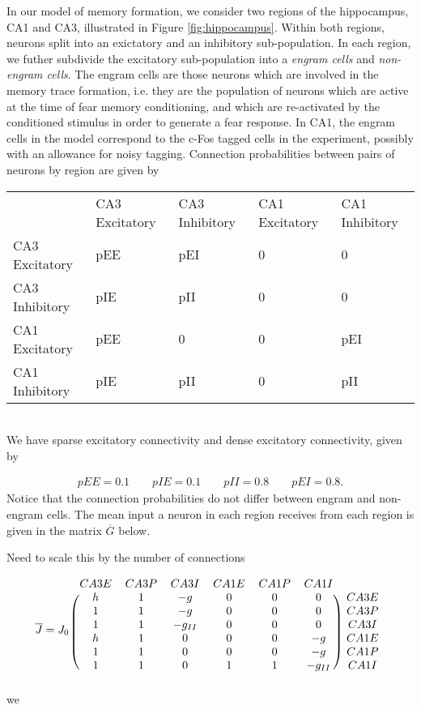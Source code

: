\documentclass [12pt]{amsart}
\theoremstyle{definition}
\begin{document}
In our model of memory formation, we consider two regions of the hippocampus, CA1 and CA3, illustrated in Figure \ref{fig:hippocampus}. Within both regions, neurons split into an exictatory and an inhibitory sub-population. In each region, we futher subdivide the excitatory sub-population into a \emph{engram cells} and \emph{non-engram cells}. The engram cells are those neurons which are involved in the memory trace formation, i.e. they are the population of neurons which are active at the time of fear memory conditioning, and which are re-activated by the conditioned stimulus in order to generate a fear response. In CA1, the engram cells in the model correspond to the c-Fos tagged cells in the experiment, possibly with an allowance for noisy tagging. 
Connection probabilities between pairs of neurons by region are given by 
\begin{table}[]
\begin{tabular}{lllll}
               & CA3 Excitatory & CA3 Inhibitory & CA1 Excitatory & CA1 Inhibitory \\ 
CA3 Excitatory & pEE            & pEI            & 0              & 0              \\
CA3 Inhibitory & pIE            & pII            & 0              & 0              \\
CA1 Excitatory & pEE            & 0              & 0              & pEI            \\
CA1 Inhibitory & pIE            & pII            & 0              & pII            \\     
\end{tabular}\\
We have sparse excitatory connectivity and dense excitatory connectivity, given by
\end{table}
\begin{align*}
pEE = 0.1\qquad
pIE = 0.1\qquad
pII = 0.8\qquad
pEI = 0.8.
\end{align*}
Notice that the connection probabilities do not differ between engram and non-engram cells. 
The mean input a neuron in each region receives from each region is  given in the matrix $\overline G$ below. 


{\color{purple} Need to scale this by the number of connections}

\[
\overline J = J_0 \,\, \begin{blockarray}{ccccccc}
 CA3 E & CA3 P & CA3 I & CA1 E & CA1 P  & CA1 I \\
\begin{block}{(cccccc)c}
h & 1 & -g & 0 & 0 & 0 &CA3 E \\
 1 & 1 & -g & 0 & 0 & 0 &CA3 P\\
 1 & 1 & -g_{II} & 0 & 0 & 0 &CA3 I \\
h & 1 & 0 & 0 & 0 & -g &CA1 E    \\
1 & 1 & 0 & 0 & 0 & -g &CA1 P  \\
1 & 1& 0 & 1 & 1 & -g_{II}  &CA1 I  \\
\end{block}
\end{blockarray}
 \]
we
\end{document}
